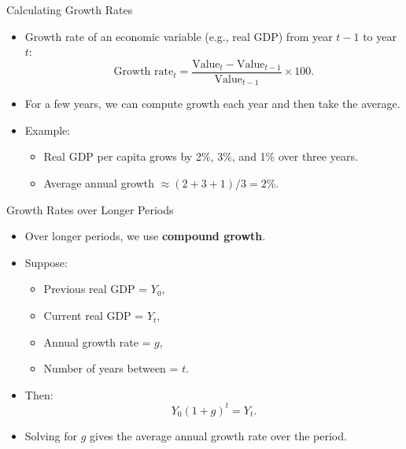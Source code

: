 \documentclass[aspectratio=169]{beamer}
\begin{document}

\begin{frame}{Calculating Growth Rates}
\transfade
\begin{itemize}[<+->]
  \item Growth rate of an economic variable (e.g., real GDP) from year \(t-1\) to year \(t\):
  \[
    \text{Growth rate}_t =
    \frac{\text{Value}_t - \text{Value}_{t-1}}{\text{Value}_{t-1}} \times 100.
  \]
  \item For a few years, we can compute growth each year and then take the average.
  \item Example:
  \begin{itemize}[<+->]
    \item Real GDP per capita grows by 2\%, 3\%, and 1\% over three years.
    \item Average annual growth \(\approx (2 + 3 + 1)/3 = 2\%\).
  \end{itemize}
\end{itemize}
\end{frame}

\begin{frame}{Growth Rates over Longer Periods}
\transfade
\begin{itemize}[<+->]
  \item Over longer periods, we use \textbf{compound growth}.
  \item Suppose:
  \begin{itemize}[<+->]
    \item Previous real GDP = \(Y_0\),
    \item Current real GDP = \(Y_t\),
    \item Annual growth rate = \(g\),
    \item Number of years between = \(t\).
  \end{itemize}
  \item Then:
  \[
    Y_0 (1 + g)^t = Y_t.
  \]
  \item Solving for \(g\) gives the average annual growth rate over the period.
\end{itemize}
\end{frame}
\end{document}
